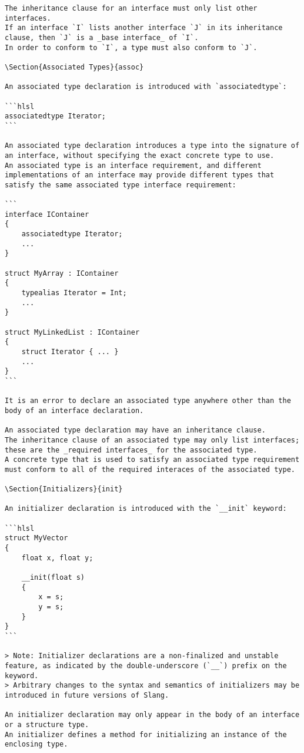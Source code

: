 \begin{verbatim}
The inheritance clause for an interface must only list other interfaces.
If an interface `I` lists another interface `J` in its inheritance clause, then `J` is a _base interface_ of `I`.
In order to conform to `I`, a type must also conform to `J`.

\Section{Associated Types}{assoc}

An associated type declaration is introduced with `associatedtype`:

```hlsl
associatedtype Iterator;
```

An associated type declaration introduces a type into the signature of an interface, without specifying the exact concrete type to use.
An associated type is an interface requirement, and different implementations of an interface may provide different types that satisfy the same associated type interface requirement:

```
interface IContainer
{
    associatedtype Iterator;
    ...
}

struct MyArray : IContainer
{
    typealias Iterator = Int;
    ...
}

struct MyLinkedList : IContainer
{
    struct Iterator { ... }
    ...
}
```

It is an error to declare an associated type anywhere other than the body of an interface declaration.

An associated type declaration may have an inheritance clause.
The inheritance clause of an associated type may only list interfaces; these are the _required interfaces_ for the associated type.
A concrete type that is used to satisfy an associated type requirement must conform to all of the required interaces of the associated type.

\Section{Initializers}{init}

An initializer declaration is introduced with the `__init` keyword:

```hlsl
struct MyVector
{
    float x, float y;

    __init(float s)
    {
        x = s;
        y = s;
    }
}
```

> Note: Initializer declarations are a non-finalized and unstable feature, as indicated by the double-underscore (`__`) prefix on the keyword.
> Arbitrary changes to the syntax and semantics of initializers may be introduced in future versions of Slang.

An initializer declaration may only appear in the body of an interface or a structure type.
An initializer defines a method for initializing an instance of the enclosing type.


\end{verbatim}
